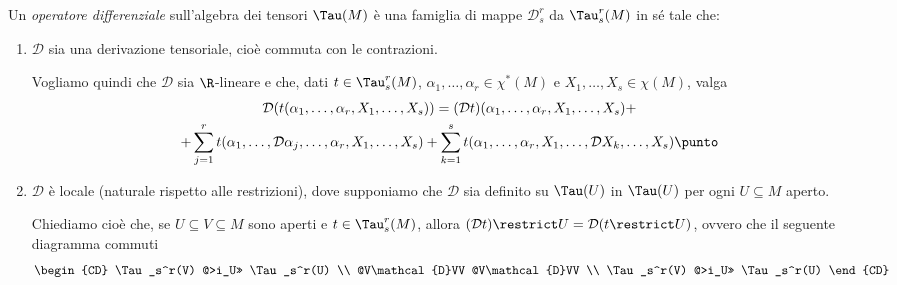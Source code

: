 \begin{definition}  \label{def:OperatoreDifferenziale}
	Un \emph{operatore differenziale} sull'algebra dei tensori $\Tau(M)$ è una famiglia di mappe $\mathcal D_s^r$ da $\Tau_s^r(M)$ in sé tale che:
	\begin{enumerate}
	 \item $\mathcal D$ sia una derivazione tensoriale, cioè commuta con le contrazioni. \label{od:Derivazione} %
	 
	 Vogliamo quindi che $\mathcal D$ sia $\R$-lineare e che, dati $t\in\Tau_s^r(M)$, $\alpha_1,\ldots,\alpha_r\in\chi^*(M)$ e $X_1,\ldots,X_s\in\chi(M)$, valga
	 \begin{multline*}
	 	\mathcal D (t(\alpha_1,\ldots,\alpha_r,X_1,\ldots,X_s)) = (\mathcal D t) (\alpha_1,\ldots,\alpha_r,X_1,\ldots,X_s) +\\
	 	+\sum_{j=1}^r t(\alpha_1,\ldots,\mathcal D \alpha_j,\ldots, \alpha_r, X_1,\ldots, X_s) +
	 	\sum_{k=1}^s t(\alpha_1,\ldots, \alpha_r, X_1,\ldots, \mathcal D X_k,\ldots, X_s) \punto
	 \end{multline*}

	\item $\mathcal D$ è locale (naturale rispetto alle restrizioni), dove supponiamo che $\mathcal D$ sia definito su $\Tau(U)$ in $\Tau(U)$ per ogni $U\subseteq M$ aperto. \label{od:Restrizioni} %
	
	Chiediamo cioè che, se $U\subseteq V \subseteq M$ sono aperti e $t\in\Tau_s^r(M)$, allora $(\mathcal D t)\restrict U = \mathcal D (t\restrict U)$, ovvero che il seguente diagramma commuti
	\begin{equation*}
	\begin{CD} 
	 \Tau_s^r(V) @>i_U>> \Tau_s^r(U) \\
	 @V\mathcal{D}VV  @V\mathcal{D}VV \\
	 \Tau_s^r(V) @>i_U>> \Tau_s^r(U) 
	\end{CD}
	\end{equation*}

	\end{enumerate}
\end{definition}

